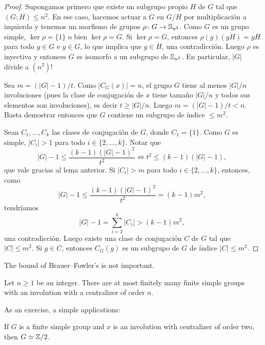 \begin{proof}
Supongamos primero que existe un subgrupo propio $H$ de $G$ tal que
$(G:H)\leq n^2$. En ese caso, hacemos actuar a $G$ en $G/H$ por multiplicación a izquierda 
y tenemos un morfismo de grupos $\rho\colon G\to\mathbb{S}_{n^2}$. Como $G$ es un grupo simple, 
$\ker\rho=\{1\}$ o bien $\ker\rho=G$. Si $\ker\rho=G$, entonces $\rho(g)(yH)=yH$ para todo
$g\in G$ e $y\in G$, lo que implica que $g\in H$, una contradicción. Luego $\rho$ es inyectiva
y entonces $G$ es isomorfo a un subgrupo de $\mathbb{S}_{n^2}$. En particular, $|G|$ divide a $(n^2)!$

Sea $m=(|G|-1)/t$. 
Como $|C_G(x)|=n$, el grupo $G$ tiene al menos $|G|/n$ involuciones (pues la clase de conjugación
de $x$ tiene tamaño $|G|/n$ y todos sus elementos son involuciones), es decir $t\geq |G|/n$. Luego
$m=(|G|-1)/t<n$. Basta demostrar entonces que $G$ contiene un subgrupo de índice $\leq m^2$. 

Sean $C_1,\dots,C_k$ las clases de conjugación de $G$, donde $C_1=\{1\}$. 
Como $G$ es simple, $|C_i|>1$ 
para todo $i\in\{2,\dots,k\}$. Notar que 
\[
|G|-1\leq\frac{(k-1)(|G|-1)^2}{t^2}\Longleftrightarrow t^2\leq(k-1)(|G|-1),
\]
que vale gracias al lema anterior. 
Si $|C_i|>m$ para todo $i\in\{2,\dots,k\}$, entonces, como
\[
|G|-1\leq\frac{(k-1)(|G|-1)^2}{t^2}=(k-1)m^2,
\]
tendríamos 
\[
|G|-1=\sum_{i=2}^k|C_i|>(k-1)m^2,
\]
una contradicción. Luego existe una clase de conjugación $C$ de $G$ tal que $|C|\leq m^2$. Si $g\in C$, entonces
$C_G(g)$ es un subgrupo de $G$ de índice $|C|\leq m^2$.
\end{proof}

The bound of Brauer--Fowler's is not important.

\begin{corollary}
    Let $n\geq 1$ be an integer. There are at most finitely many 
    finite simple groups with an involution with a centralizer of order $n$.
\end{corollary}

As an exercise, a simple applications: 

\begin{exercise}
    If $G$ is a finite simple group and $x$ is an involution with
    centralizer of order two, then  
    $G\simeq\mathbb{Z}/2$. 
\end{exercise}




